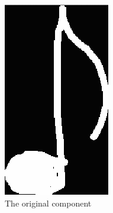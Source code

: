 \begin{figure}[H]
  \centering

  \begin{subfigure}[b]{.2\linewidth}
      \centering
      \includegraphics[width=\linewidth]{gfx/techniques/stem-detection-1.png}
      \caption{The original component}
      \label{fig:stem-segmentation-1}
  \end{subfigure}
  \begin{subfigure}[b]{.2\linewidth}

\end{subfigure}
\end{figure}
